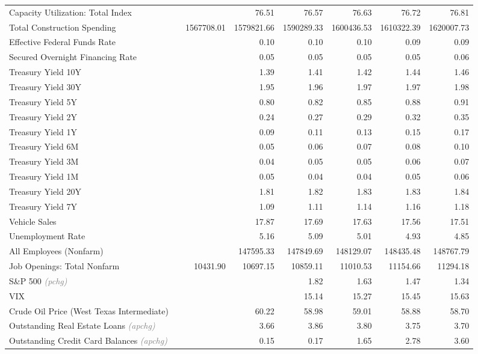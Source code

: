\documentclass[11pt, letterpaper]{article}\usepackage[]{graphicx}\usepackage[]{color}
\begin{document}
\begin{table}[H]
\begin{tabular}{lrrrrrrr}
  Capacity Utilization: Total Index &  &  & 76.51 & 76.57 & 76.63 & 76.72 & 76.81 \\ 
  Total Construction Spending &  & 1567708.01 & 1579821.66 & 1590289.33 & 1600436.53 & 1610322.39 & 1620007.73 \\ 
  Effective Federal Funds Rate &  &  & 0.10 & 0.10 & 0.10 & 0.09 & 0.09 \\ 
  Secured Overnight Financing Rate &  &  & 0.05 & 0.05 & 0.05 & 0.05 & 0.06 \\ 
  Treasury Yield 10Y &  &  & 1.39 & 1.41 & 1.42 & 1.44 & 1.46 \\ 
  Treasury Yield 30Y &  &  & 1.95 & 1.96 & 1.97 & 1.97 & 1.98 \\ 
  Treasury Yield 5Y &  &  & 0.80 & 0.82 & 0.85 & 0.88 & 0.91 \\ 
  Treasury Yield 2Y &  &  & 0.24 & 0.27 & 0.29 & 0.32 & 0.35 \\ 
  Treasury Yield 1Y &  &  & 0.09 & 0.11 & 0.13 & 0.15 & 0.17 \\ 
  Treasury Yield 6M &  &  & 0.05 & 0.06 & 0.07 & 0.08 & 0.10 \\ 
  Treasury Yield 3M &  &  & 0.04 & 0.05 & 0.05 & 0.06 & 0.07 \\ 
  Treasury Yield 1M &  &  & 0.05 & 0.04 & 0.04 & 0.05 & 0.06 \\ 
  Treasury Yield 20Y &  &  & 1.81 & 1.82 & 1.83 & 1.83 & 1.84 \\ 
  Treasury Yield 7Y &  &  & 1.09 & 1.11 & 1.14 & 1.16 & 1.18 \\ 
  Vehicle Sales &  &  & 17.87 & 17.69 & 17.63 & 17.56 & 17.51 \\ 
  Unemployment Rate &  &  & 5.16 & 5.09 & 5.01 & 4.93 & 4.85 \\ 
  All Employees (Nonfarm) &  &  & 147595.33 & 147849.69 & 148129.07 & 148435.48 & 148767.79 \\ 
  Job Openings: Total Nonfarm &  & 10431.90 & 10697.15 & 10859.11 & 11010.53 & 11154.66 & 11294.18 \\ 
  S\&P 500 \textit{\footnotesize\textcolor{gray}{(pchg)}} &  &  &  & 1.82 & 1.63 & 1.47 & 1.34 \\ 
  VIX &  &  &  & 15.14 & 15.27 & 15.45 & 15.63 \\ 
  Crude Oil Price (West Texas Intermediate) &  &  & 60.22 & 58.98 & 59.01 & 58.88 & 58.70 \\ 
  Outstanding Real Estate Loans \textit{\footnotesize\textcolor{gray}{(apchg)}} &  &  & 3.66 & 3.86 & 3.80 & 3.75 & 3.70 \\ 
  Outstanding Credit Card Balances \textit{\footnotesize\textcolor{gray}{(apchg)}} &  &  & 0.15 & 0.17 & 1.65 & 2.78 & 3.60 \\ 

\end{tabular}
\end{table}
\end{document}

